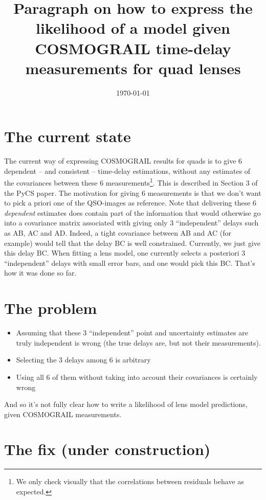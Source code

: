 \documentclass[11pt]{scrartcl}
\begin{document}
\title{Paragraph on how to express the likelihood of a model given COSMOGRAIL time-delay measurements for quad lenses}
\date{\today}
\maketitle


\section{The current state}

The current way of expressing COSMOGRAIL results for quads is to give 6 dependent -- and consistent -- time-delay estimations, without any estimates of the covariances between these 6 measurements\footnote{We only check visually that the correlations between residuals behave as expected.}. This is described in Section 3 of the PyCS paper. The motivation for giving 6 measurements is that we don't want to pick a priori one of the QSO-images as reference. Note that delivering these 6 \emph{dependent} estimates does contain part of the information that would otherwise go into a covariance matrix associated with giving only 3 ``independent'' delays such as AB, AC and AD. Indeed, a tight covariance between AB and AC (for example) would tell that the delay BC is well constrained. Currently, we just give this delay BC. When fitting a lens model, one currently selects a posteriori 3 ``independent'' delays with small error bars, and one would pick this BC. That's how it was done so far.

\section{The problem}

\begin{itemize}
\item Assuming that these 3 ``independent'' point and uncertainty estimates are truly independent is wrong (the true delays are, but not their measurements). 
\item Selecting the 3 delays among 6 is arbitrary
\item Using all 6 of them without taking into account their covariances is certainly wrong
\end{itemize}

And so it's not fully clear how to write a likelihood of lens model predictions, given COSMOGRAIL measurements.

\section{The fix (under construction)}
\end{document}
